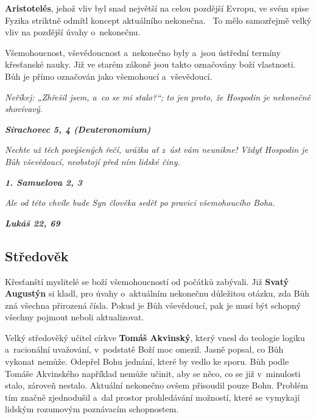 \documentclass[czech]{article}
\begin{document}
\textbf{Aristotelés}, jehož vliv byl snad největší na celou pozdější Evropu, ve svém spise Fyzika striktně odmítl koncept aktuálního nekonečna.~\cite{aristoteles_fyzika} To mělo samozřejmě velký vliv na pozdější úvahy o~nekonečnu.

Všemohoucnost, vševědoucnost a~nekonečno byly a~jsou ústřední termíny křesťanské nauky.
Již ve starém zákoně jsou takto označovány boží vlastnosti. 
Bůh je přímo označován jako všemohoucí a~vševědoucí.

\begin{center}
\textit{Neříkej: „Zhřešil jsem, a~co se mi stalo?“; to jen proto, že Hospodin je nekonečně shovívavý.}

\textit{\textbf{Sírachovec 5, 4 (Deuteronomium)}}
\end{center}

\begin{center}
\textit{Nechte už těch povýšených řečí, urážka ať z~úst vám neunikne! Vždyť Hospodin je Bůh vševědoucí, neobstojí před ním lidské činy.}

\textit{\textbf{1. Samuelova 2, 3}}
\end{center}

\begin{center}
\textit{Ale od této chvíle bude Syn člověka sedět po pravici všemohoucího Boha.}

\textit{\textbf{Lukáš 22, 69}}
\end{center}

\subsection*{Středověk}

Křesťanští myslitelé se boží všemohoucností od počátků zabývali.
Již \textbf{Svatý Augustýn} si kladl, pro úvahy o~aktuálním nekonečnu důležitou otázku, zda Bůh zná všechna přirozená čísla. Pokud je Bůh vševědoucí, pak je musí být schopný všechny pojmout neboli aktualizovat.

Velký středověký učitel církve \textbf{Tomáš Akvinský}, který vnesl do teologie logiku a~racionální uvažování, v~podstatě Boží moc omezil. Jasně popsal, co Bůh vykonat nemůže. Odepřel Bohu jednání, které by vedlo ke sporu. Bůh podle Tomáše Akvinského například nemůže učinit, aby se něco, co se již v~minulosti stalo, zároveň nestalo.
Aktuální nekonečno ovšem přisoudil pouze Bohu. Problém tím značně zjednodušil a~dal prostor prohledávání možností, které se vymykají lidským rozumovým poznávacím schopnostem.~\cite{vopenka_infinitni_mateatika}
\end{document}

